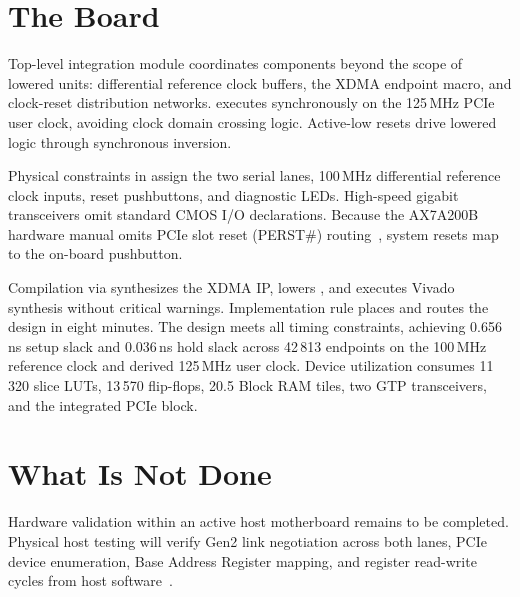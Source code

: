\documentclass[journal,9pt]{IEEEtran}
\begin{document}
\section{The Board}
\label{sec:p-board}

Top-level integration module  coordinates components beyond the
scope of lowered units: differential reference clock buffers, the XDMA endpoint
macro, and clock-reset distribution networks.  executes
synchronously on the 125\,MHz PCIe user clock, avoiding clock domain crossing
logic. Active-low resets drive lowered logic through synchronous inversion.



Physical constraints in  assign the two
serial lanes, 100\,MHz differential reference clock inputs, reset pushbuttons,
and diagnostic LEDs. High-speed gigabit transceivers omit standard CMOS I/O
declarations. Because the AX7A200B hardware manual omits PCIe slot reset (PERST\#)
routing~\cite{i179}, system resets map to the on-board pushbutton.



Compilation via  synthesizes the XDMA
IP, lowers , and executes Vivado synthesis without critical
warnings. Implementation rule  places and routes the
design in eight minutes. The design meets all timing constraints, achieving
0.656\,ns setup slack and 0.036\,ns hold slack across 42\,813 endpoints on the
100\,MHz reference clock and derived 125\,MHz user clock. Device utilization
consumes 11\,320 slice LUTs, 13\,570 flip-flops, 20.5 Block RAM tiles, two GTP
transceivers, and the integrated PCIe block.

\section{What Is Not Done}
\label{sec:p-not}

Hardware validation within an active host motherboard remains to be completed.
Physical host testing will verify Gen2 link negotiation across both lanes, PCIe
device enumeration, Base Address Register mapping, and register read-write
cycles from host software~\cite{i180}.
\end{document}
